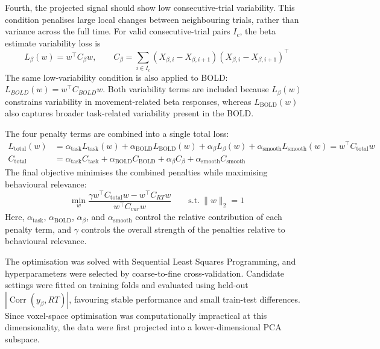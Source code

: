 \documentclass[utf8]{FrontiersinHarvard}
\begin{document}
Fourth, the projected signal should show low consecutive-trial variability. This condition penalises large local changes between neighbouring trials, rather than variance across the full time. For valid consecutive-trial pairs \(I_c\), the beta estimate variability loss is
\begin{equation*} 
L_{\beta}(w) = w^\top C_{\beta}w, 
\qquad
C_{\beta} = \sum_{i\in I_c} \left(X_{\beta,i}-X_{\beta,i+1}\right) \left(X_{\beta,i}-X_{\beta,i+1}\right)^\top 
\end{equation*}
The same low-variability condition is also applied to BOLD: \(L_{BOLD}(w) = w^\top C_{BOLD}w\). Both variability terms are included because \(L_{\beta}(w)\) constrains variability in movement-related beta responses, whereas \(L_{\mathrm{BOLD}}(w)\) also captures broader task-related variability present in the BOLD.

The four penalty terms are combined into a single total loss:
\begin{equation*}
\begin{split}
L_{\mathrm{total}}(w)
&=
\alpha_{\mathrm{task}} L_{\mathrm{task}}(w)
+
\alpha_{\mathrm{BOLD}} L_{\mathrm{BOLD}}(w)
+
\alpha_{\beta} L_{\beta}(w)
+
\alpha_{\mathrm{smooth}} L_{\mathrm{smooth}}(w)
=
w^\top C_{\mathrm{total}}w \\
C_{\mathrm{total}}
&=
\alpha_{\mathrm{task}} C_{\mathrm{task}}
+
\alpha_{\mathrm{BOLD}} C_{\mathrm{BOLD}}
+
\alpha_{\beta} C_{\beta}
+
\alpha_{\mathrm{smooth}} C_{\mathrm{smooth}}
\end{split}
\end{equation*}
The final objective minimises the combined penalties while maximising behavioural relevance:
\begin{equation*}
\min_w
\frac{
\gamma w^\top C_{\mathrm{total}}w
-
w^\top C_{RT}w
}{
w^\top C_{var}w
}
\qquad
\mathrm{s.t.}\ \|w\|_2=1
\end{equation*}
Here, \(\alpha_{\mathrm{task}}\), \(\alpha_{\mathrm{BOLD}}\), \(\alpha_{\beta}\), and \(\alpha_{\mathrm{smooth}}\) control the relative contribution of each penalty term, and \(\gamma\) controls the overall strength of the penalties relative to behavioural relevance. 

The optimisation was solved with Sequential Least Squares Programming, and hyperparameters were selected by coarse-to-fine cross-validation. Candidate settings were fitted on training folds and evaluated using held-out \(|\operatorname{Corr}(y_{\beta}, RT)|\), favouring stable performance and small train-test differences. 
Since voxel-space optimisation was computationally impractical at this dimensionality, the data were first projected into a lower-dimensional PCA subspace.
\end{document}
